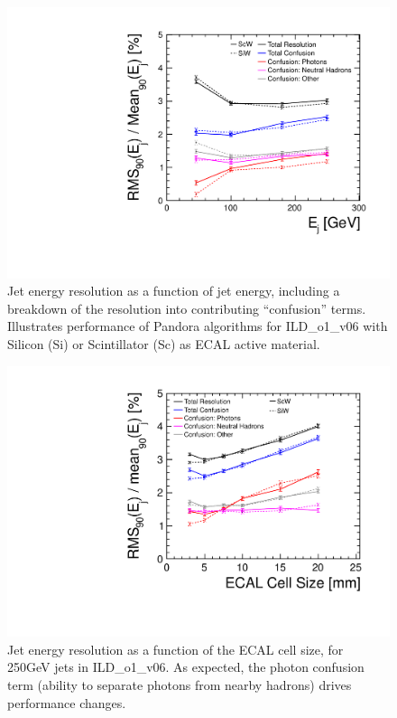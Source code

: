 \begin{figure}
\includegraphics{Software/PandoraPFA/JetEnergyResolution}
\caption{Jet energy resolution as a function of jet energy, including a breakdown of the
resolution into contributing “confusion” terms. Illustrates performance of
Pandora algorithms for ILD_o1_v06 with Silicon (Si) or Scintillator (Sc) as ECAL
active material.}
\label{fig:Software:PandoraPFA:JetEnergyResolution}
\end{figure}

\begin{figure}
\includegraphics{Software/PandoraPFA/ECAL_CellSize}
\caption{ Jet energy resolution as a function of the ECAL cell size, for 250GeV jets in
ILD_o1_v06. As expected, the photon confusion term (ability to separate photons
from nearby hadrons) drives performance changes.}
\label{fig:Software:PandoraPFA:ECAL_CellSize}
\end{figure}

